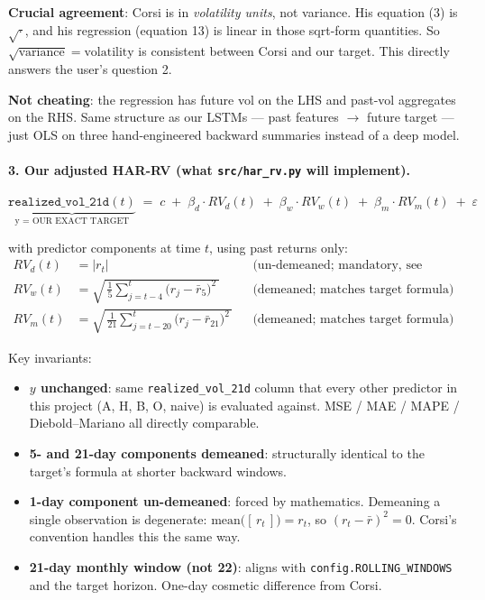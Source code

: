 \documentclass[11pt]{article}
\begin{document}
\textbf{Crucial agreement}: Corsi is in \emph{volatility units}, not variance. His equation (3) is $\sqrt{\cdot}$, and his regression (equation 13) is linear in those sqrt-form quantities. So $\sqrt{\text{variance}} = \text{volatility}$ is consistent between Corsi and our target. This directly answers the user's question 2.

\textbf{Not cheating}: the regression has future vol on the LHS and past-vol aggregates on the RHS. Same structure as our LSTMs --- past features $\to$ future target --- just OLS on three hand-engineered backward summaries instead of a deep model.

\paragraph{3. Our adjusted HAR-RV (what \texttt{src/har\_rv.py} will implement).}
\begin{equation}
\underbrace{\texttt{realized\_vol\_21d}(t)}_{\text{y = OUR EXACT TARGET}} \;=\; c \;+\; \beta_d \cdot RV_d(t) \;+\; \beta_w \cdot RV_w(t) \;+\; \beta_m \cdot RV_m(t) \;+\; \varepsilon
\end{equation}

with predictor components at time $t$, using past returns only:
\begin{align}
RV_d(t) &= |r_t|                                                                       && \text{(un-demeaned; mandatory, see below)} \\
RV_w(t) &= \sqrt{\,\tfrac{1}{5}\sum_{j=t-4}^{t}\bigl(r_j-\bar r_{5}\bigr)^{2}\,}       && \text{(demeaned; matches target formula)} \\
RV_m(t) &= \sqrt{\,\tfrac{1}{21}\sum_{j=t-20}^{t}\bigl(r_j-\bar r_{21}\bigr)^{2}\,}    && \text{(demeaned; matches target formula)}
\end{align}

Key invariants:

\begin{itemize}[leftmargin=*]
  \item \textbf{$y$ unchanged}: same \texttt{realized\_vol\_21d} column that every other predictor in this project (A, H, B, O, naive) is evaluated against. MSE / MAE / MAPE / Diebold--Mariano all directly comparable.
  \item \textbf{5- and 21-day components demeaned}: structurally identical to the target's formula at shorter backward windows.
  \item \textbf{1-day component un-demeaned}: forced by mathematics. Demeaning a single observation is degenerate: $\text{mean}\bigl([\,r_t\,]\bigr) = r_t$, so $(r_t - \bar r)^2 = 0$. Corsi's convention handles this the same way.
  \item \textbf{21-day monthly window (not 22)}: aligns with \texttt{config.ROLLING\_WINDOWS} and the target horizon. One-day cosmetic difference from Corsi.
\end{itemize}
\end{document}
